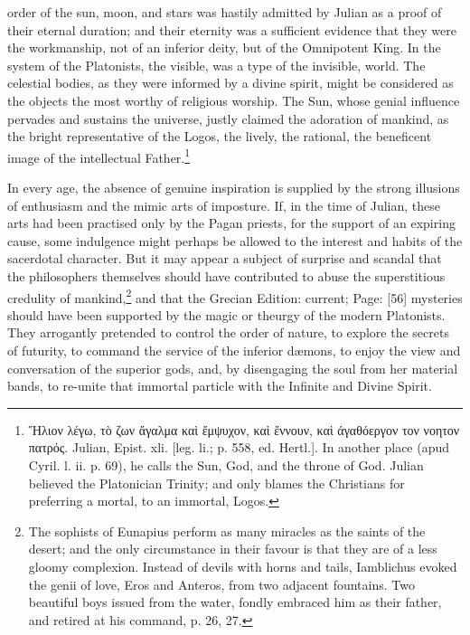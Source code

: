 order of the sun, moon, and stars was hastily admitted by Julian as a proof of their eternal duration; and their eternity was a sufficient evidence that they were the workmanship, not of an inferior deity, but of the Omnipotent King. In the system of the Platonists, the visible, was a type of the invisible, world. The celestial bodies, as they were informed by a divine spirit, might be considered as the objects the most worthy of religious worship. The Sun, whose genial influence pervades and sustains the universe, justly claimed the adoration of mankind, as the bright representative of the Logos, the lively, the rational, the beneficent image of the intellectual Father.\footnote{\textgreek{\texthebrew{Ἥ}λιον λέγω, τ\texthebrew{ὸ} ζων \texthebrew{ἄ}γαλμα κα\texthebrew{ὶ ἔ}μψυχον, κα\texthebrew{ὶ ἔ}ννουν, κα\texthebrew{ὶ} άγαθόεργον τον νοητον πατρός}. Julian, Epist. xli. [leg. li.; p. 558, ed. Hertl.]. In another place (apud Cyril. l. ii. p. 69), he calls the Sun, God, and the throne of God. Julian believed the Platonician Trinity; and only blames the Christians for preferring a mortal, to an immortal, Logos.}

In every age, the absence of genuine inspiration is supplied by the strong illusions of enthusiasm and the mimic arts of imposture. If, in the time of Julian, these arts had been practised only by the Pagan priests, for the support of an expiring cause, some indulgence might perhaps be allowed to the interest and habits of the sacerdotal character. But it may appear a subject of surprise and scandal that the philosophers themselves should have contributed to abuse the superstitious credulity of mankind,\footnote{The sophists of Eunapius perform as many miracles as the saints of the desert; and the only circumstance in their favour is that they are of a less gloomy complexion. Instead of devils with horns and tails, Iamblichus evoked the genii of love, Eros and Anteros, from two adjacent fountains. Two beautiful boys issued from the water, fondly embraced him as their father, and retired at his command, p. 26, 27.} and that the Grecian Edition: current; Page: [56] mysteries should have been supported by the magic or theurgy of the modern Platonists. They arrogantly pretended to control the order of nature, to explore the secrets of futurity, to command the service of the inferior dæmons, to enjoy the view and conversation of the superior gods, and, by disengaging the soul from her material bands, to re-unite that immortal particle with the Infinite and Divine Spirit.

